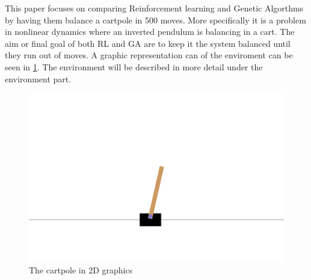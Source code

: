 This paper focuses on comparing Reinforcement learning and Genetic Algorthms by having them balance a cartpole in 500 moves. More specifically it is a problem in nonlinear dynamics where an inverted pendulum is balancing in a cart. The aim or final goal of both RL and GA are to keep it the system balanced until they run out of moves. A graphic representation can of the enviroment can be seen in \ref{figPOLE}. The environment will be described in more detail under the environment part.  
\begin{figure}[H]
    \centering
    \includegraphics [scale = 0.18]{Images/cartpole.png}
    \caption{The cartpole in 2D graphics}
    \label{figPOLE}
\end{figure}


